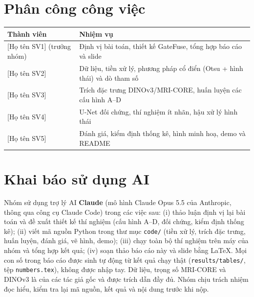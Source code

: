 \documentclass[11pt,a4paper]{article}
\begin{document}
\section{Phân công công việc}
\begin{center}\small
\begin{tabularx}{\linewidth}{lX}
\toprule
Thành viên & Nhiệm vụ\\
\midrule
{[Họ tên SV1]} (trưởng nhóm) & Định vị bài toán, thiết kế GateFuse, tổng hợp báo cáo và slide\\
{[Họ tên SV2]} & Dữ liệu, tiền xử lý, phương pháp cổ điển (Otsu + hình thái) và dò tham số\\
{[Họ tên SV3]} & Trích đặc trưng DINOv3/MRI-CORE, huấn luyện các cấu hình A--D\\
{[Họ tên SV4]} & U-Net đối chứng, thí nghiệm ít nhãn, hậu xử lý hình thái\\
{[Họ tên SV5]} & Đánh giá, kiểm định thống kê, hình minh hoạ, demo và README\\
\bottomrule
\end{tabularx}
\end{center}

\section{Khai báo sử dụng AI}
Nhóm sử dụng trợ lý AI \textbf{Claude} (mô hình Claude Opus 5.5 của Anthropic, thông qua công cụ Claude Code) trong các việc sau: (i) thảo luận định vị lại bài toán và đề xuất thiết kế thí nghiệm (cấu hình A--D, đối chứng, kiểm định thống kê); (ii) viết mã nguồn Python trong thư mục \texttt{code/} (tiền xử lý, trích đặc trưng, huấn luyện, đánh giá, vẽ hình, demo); (iii) chạy toàn bộ thí nghiệm trên máy của nhóm và tổng hợp kết quả; (iv) soạn thảo báo cáo này và slide bằng LaTeX. Mọi con số trong báo cáo được sinh tự động từ kết quả chạy thật (\texttt{results/tables/}, tệp \texttt{numbers.tex}), không được nhập tay. Dữ liệu, trọng số MRI-CORE và DINOv3 là của các tác giả gốc và được trích dẫn đầy đủ. Nhóm chịu trách nhiệm đọc hiểu, kiểm tra lại mã nguồn, kết quả và nội dung trước khi nộp.
\end{document}
